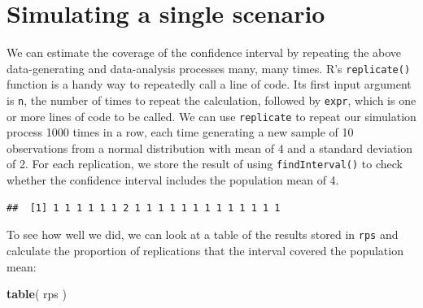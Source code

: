\documentclass[
]{book}
\newenvironment{Shaded}{\begin{snugshade}}{\end{snugshade}}
\newcommand{\AttributeTok}[1]{\textcolor[rgb]{0.13,0.29,0.53}{#1}}
\newcommand{\DecValTok}[1]{\textcolor[rgb]{0.00,0.00,0.81}{#1}}
\newcommand{\FunctionTok}[1]{\textcolor[rgb]{0.13,0.29,0.53}{\textbf{#1}}}
\newcommand{\NormalTok}[1]{#1}
\newcommand{\OtherTok}[1]{\textcolor[rgb]{0.56,0.35,0.01}{#1}}
\newcommand{\SpecialCharTok}[1]{\textcolor[rgb]{0.81,0.36,0.00}{\textbf{#1}}}
\begin{document}
\section{Simulating a single scenario}\label{simulating-a-single-scenario}

We can estimate the coverage of the confidence interval by repeating the above data-generating and data-analysis processes many, many times.
R's \texttt{replicate()} function is a handy way to repeatedly call a line of code.
Its first input argument is \texttt{n}, the number of times to repeat the calculation, followed by \texttt{expr}, which is one or more lines of code to be called.
We can use \texttt{replicate} to repeat our simulation process 1000 times in a row, each time generating a new sample of 10 observations from a normal distribution with mean of 4 and a standard deviation of 2.
For each replication, we store the result of using \texttt{findInterval()} to check whether the confidence interval includes the population mean of 4.

\begin{Shaded}
\end{Shaded}

\begin{verbatim}
##  [1] 1 1 1 1 1 1 2 1 1 1 1 1 1 1 1 1 1 1 1 1
\end{verbatim}

To see how well we did, we can look at a table of the results stored in \texttt{rps} and calculate the proportion of replications that the interval covered the population mean:

\begin{Shaded}
\begin{Highlighting}[]
\FunctionTok{table}\NormalTok{( rps )}
\end{Highlighting}
\end{Shaded}
\end{document}
